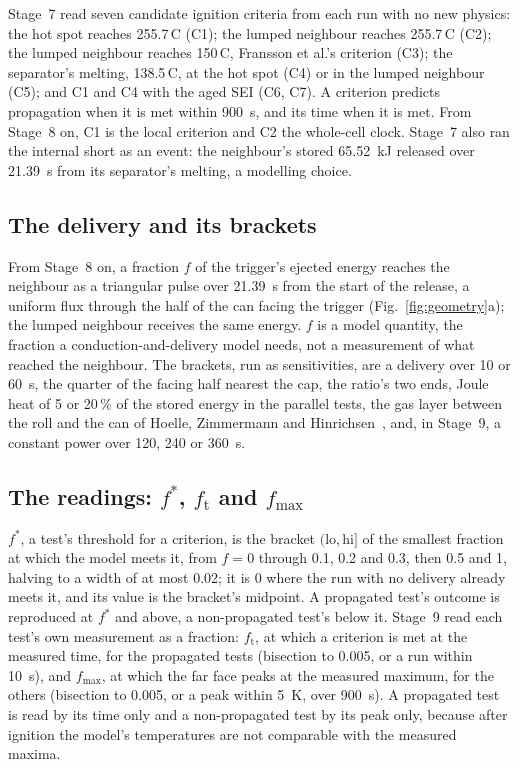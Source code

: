 \documentclass[preprint,12pt]{elsarticle}
\newcommand{\degC}{\,\textdegree C}
\newcommand{\fs}{f^{*}}
\newcommand{\ft}{f_{\mathrm{t}}}
\newcommand{\fmax}{f_{\mathrm{max}}}
\begin{document}
Stage~7 read seven candidate ignition criteria from each run with no new physics: the hot spot reaches 255.7\degC{} (C1); the lumped neighbour reaches 255.7\degC{} (C2); the lumped neighbour reaches 150\degC, Fransson et al.'s criterion (C3); the separator's melting, 138.5\degC, at the hot spot (C4) or in the lumped neighbour (C5); and C1 and C4 with the aged SEI (C6, C7). A criterion predicts propagation when it is met within 900~s, and its time when it is met. From Stage~8 on, C1 is the local criterion and C2 the whole-cell clock. Stage~7 also ran the internal short as an event: the neighbour's stored 65.52~kJ released over 21.39~s from its separator's melting, a modelling choice.

\subsection{The delivery and its brackets}
\label{sec:delivery}

From Stage~8 on, a fraction $f$ of the trigger's ejected energy reaches the neighbour as a triangular pulse over 21.39~s from the start of the release, a uniform flux through the half of the can facing the trigger (Fig.~\ref{fig:geometry}a); the lumped neighbour receives the same energy. $f$ is a model quantity, the fraction a conduction-and-delivery model needs, not a measurement of what reached the neighbour. The brackets, run as sensitivities, are a delivery over 10 or 60~s, the quarter of the facing half nearest the cap, the ratio's two ends, Joule heat of 5 or 20\,\% of the stored energy in the parallel tests, the gas layer between the roll and the can of Hoelle, Zimmermann and Hinrichsen~\cite{hoelle2023simulation}, and, in Stage~9, a constant power over 120, 240 or 360~s.

\subsection{The readings: \texorpdfstring{$\fs$, $\ft$ and $\fmax$}{f*, f\_t and f\_max}}
\label{sec:readings}

$\fs$, a test's threshold for a criterion, is the bracket $(\mathrm{lo},\mathrm{hi}]$ of the smallest fraction at which the model meets it, from $f=0$ through 0.1, 0.2 and 0.3, then 0.5 and 1, halving to a width of at most 0.02; it is 0 where the run with no delivery already meets it, and its value is the bracket's midpoint. A propagated test's outcome is reproduced at $\fs$ and above, a non-propagated test's below it. Stage~9 read each test's own measurement as a fraction: $\ft$, at which a criterion is met at the measured time, for the propagated tests (bisection to 0.005, or a run within 10~s), and $\fmax$, at which the far face peaks at the measured maximum, for the others (bisection to 0.005, or a peak within 5~K, over 900~s). A propagated test is read by its time only and a non-propagated test by its peak only, because after ignition the model's temperatures are not comparable with the measured maxima.
\end{document}
